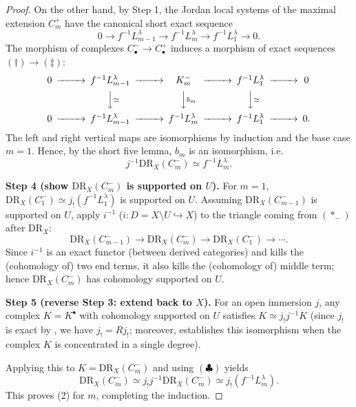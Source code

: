 \begin{proof}
    On the other hand, by Step 1, the Jordan local systems of the maximal extension $C^+_m$ have the canonical short exact sequence
    \[
        0\to f^{-1}L_{m-1}^\lambda \longrightarrow f^{-1}L_m^\lambda\longrightarrow f^{-1}L_1^\lambda\to 0.
        \tag{$\ddagger$}
    \]
    The morphism of complexes $C_\bullet^{-}\to C_\bullet^{+}$ induces a morphism
    of exact sequences $(\dagger)\to(\ddagger)$:
    \[
        \begin{CD}
            0 @>>> f^{-1}L_{m-1}^\lambda @>>> K_m^{-} @>>> f^{-1}L_1^\lambda @>>> 0\\
            @. @VV{\simeq}V @VV{b_m}V @VV{\simeq}V @.\\
            0 @>>> f^{-1}L_{m-1}^\lambda @>>> f^{-1}L_m^\lambda @>>> f^{-1}L_1^\lambda @>>> 0 .
        \end{CD}
    \]
    The left and right vertical maps are isomorphisms by induction and the base case $m=1$.
    Hence, by the short five lemma, $b_m$ is an isomorphism, i.e.
    \[
        j^{-1}\mathrm{DR}_X(C_m^{-})\simeq f^{-1}L_m^\lambda.
        \tag{$\clubsuit$}
    \]

    \medskip
    \noindent\textbf{Step 4 (show $\mathrm{DR}_X(C_m^{-})$ is supported on $U$).}
    For $m=1$, $\mathrm{DR}_X(C_1^{-})\simeq j_!(f^{-1}L_1^\lambda)$ is supported on $U$.
    Assuming $\mathrm{DR}_X(C_{m-1}^{-})$ is supported on $U$, apply $i^{-1}$ ($i:D = X\setminus U\hookrightarrow X$)
    to the triangle coming from $(\ast_-)$ after $\mathrm{DR}_X$:
    \[
        \mathrm{DR}_X(C_{m-1}^{-})\to \mathrm{DR}_X(C_m^{-})\to \mathrm{DR}_X(C_1^{-})\to \cdots.
    \]
    Since $i^{-1}$ is an exact functor (between derived categories) and kills the (cohomology of) two end terms,
    it also kills the (cohomology of) middle term;
    hence $\mathrm{DR}_X(C_m^{-})$ has cohomology supported on $U$.

    \medskip
    \noindent\textbf{Step 5 (reverse Step 3: extend back to $X$).}
    For an open immersion $j$, any complex $K = K^\bullet$ with cohomology supported on $U$
    satisfies $K\simeq j_!j^{-1}K$
    (since $j_!$ is exact by \cite[\href{https://stacks.math.columbia.edu/tag/01AK}{Tag 01AK}]{stacks-project}, we have $j_! = Rj_!$; moreover, \cite[\href{https://stacks.math.columbia.edu/tag/00A8}{Tag 00A8}]{stacks-project} establishes this isomorphism when the complex $K$ is concentrated in a single degree).

    Applying this to $K=\mathrm{DR}_X(C_m^{-})$ and using $(\clubsuit)$ yields
    \[
        \mathrm{DR}_X(C_m^{-})
        \simeq j_!j^{-1}\mathrm{DR}_X(C_m^{-})
        \simeq j_!(f^{-1}L_m^\lambda).
    \]
    This proves (2) for $m$, completing the induction.

\end{proof}

